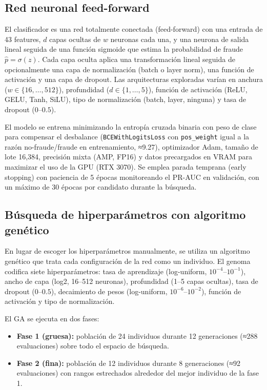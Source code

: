 \documentclass[11pt,a4paper]{article}
\begin{document}
\subsection{Red neuronal feed-forward}
El clasificador es una red totalmente conectada (feed-forward) con una entrada de 43 features, $d$ capas ocultas de $w$ neuronas cada una, y una neurona de salida lineal seguida de una función sigmoide que estima la probabilidad de fraude $\hat{p} = \sigma(z)$. Cada capa oculta aplica una transformación lineal seguida de opcionalmente una capa de normalización (batch o layer norm), una función de activación y una capa de dropout. Las arquitecturas exploradas varían en anchura ($w \in \{16,\dots,512\}$), profundidad ($d \in \{1,\dots,5\}$), función de activación (ReLU, GELU, Tanh, SiLU), tipo de normalización (batch, layer, ninguna) y tasa de dropout ($0$--$0.5$).

El modelo se entrena minimizando la entropía cruzada binaria con peso de clase para compensar el desbalance (\texttt{BCEWithLogitsLoss} con \texttt{pos\_weight} igual a la razón no-fraude/fraude en entrenamiento, ≈9.27), optimizador Adam, tamaño de lote 16,384, precisión mixta (AMP, FP16) y datos precargados en VRAM para maximizar el uso de la GPU (RTX 3070). Se emplea parada temprana (early stopping) con paciencia de 5 épocas monitoreando el PR-AUC en validación, con un máximo de 30 épocas por candidato durante la búsqueda.

\subsection{Búsqueda de hiperparámetros con algoritmo genético}
En lugar de escoger los hiperparámetros manualmente, se utiliza un algoritmo genético que trata cada configuración de la red como un individuo. El genoma codifica siete hiperparámetros: tasa de aprendizaje (log-uniform, $10^{-4}$--$10^{-1}$), ancho de capa (log2, 16--512 neuronas), profundidad (1--5 capas ocultas), tasa de dropout ($0$--$0.5$), decaimiento de pesos (log-uniform, $10^{-6}$--$10^{-2}$), función de activación y tipo de normalización.

El GA se ejecuta en dos fases:
\begin{itemize}
\item \textbf{Fase 1 (gruesa):} población de 24 individuos durante 12 generaciones (≈288 evaluaciones) sobre todo el espacio de búsqueda.
\item \textbf{Fase 2 (fina):} población de 12 individuos durante 8 generaciones (≈92 evaluaciones) con rangos estrechados alrededor del mejor individuo de la fase 1.
\end{itemize}
\end{document}
